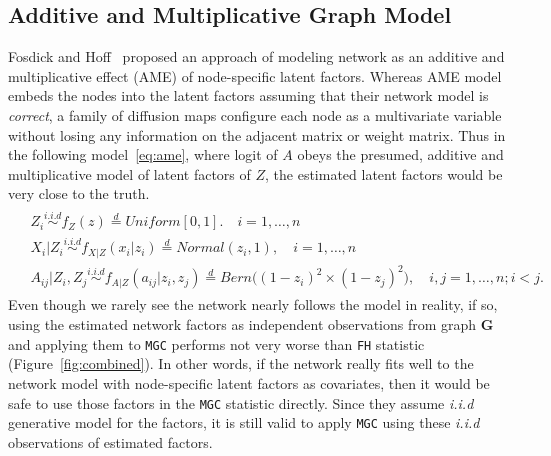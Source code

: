 \documentclass[11pt]{article}
\theoremstyle{definition}
\begin{document}
\subsection{Additive and Multiplicative Graph Model}
\label{ssec:ame}

Fosdick and Hoff~\cite{fosdick2015testing} proposed an approach of modeling network as an additive and multiplicative effect (AME) of node-specific latent factors. Whereas AME model embeds the nodes into the latent factors assuming that their network model is \textit{correct}, a family of diffusion maps configure each node as a multivariate variable without losing any information on the adjacent matrix or weight matrix. Thus in the following model~\ref{eq:ame}, where logit of $A$ obeys the presumed, additive and multiplicative model of latent factors of $Z$, the estimated latent factors would be very close to the truth. 
\begin{equation}
\label{eq:ame}
\begin{gathered}
\begin{aligned}
&	Z_{i} \overset{i.i.d}{\sim} f_{Z}(z) \stackrel{d}{=} Uniform[0,1]. \quad i = 1, \ldots, n \\ 
&	X_{i} | Z_{i} \overset{i.i.d}{\sim}  f_{X|Z}(x_{i} | z_{i}) \stackrel{d}{=}  Normal(z_{i}, 1), \quad i= 1, \ldots, n \\
&	A_{ij} | Z_{i}, Z_{j} \overset{i.i.d}{\sim}  f_{A|Z}(a_{ij} | z_{i}, z_{j}) \stackrel{d}{=}   Bern \big(  ( 1 - z_{i})^2 \times (1 - z_{j})^2    \big), \quad i,j = 1, \ldots, n;  i < j.
\end{aligned}
\end{gathered}
\end{equation}	
Even though we rarely see the network nearly follows the model in reality, if so, using the estimated network factors as independent observations from graph \textbf{G} and applying them to \texttt{MGC} performs not very worse than \texttt{FH} statistic (Figure~\ref{fig:combined}). In other words, if the network really fits well to the network model with node-specific latent factors as covariates, then it would be safe to use those factors in the \texttt{MGC} statistic directly. Since they assume \textit{i.i.d} generative model for the factors, it is still valid to apply \texttt{MGC} using these \textit{i.i.d} observations of estimated factors.

\end{document}
